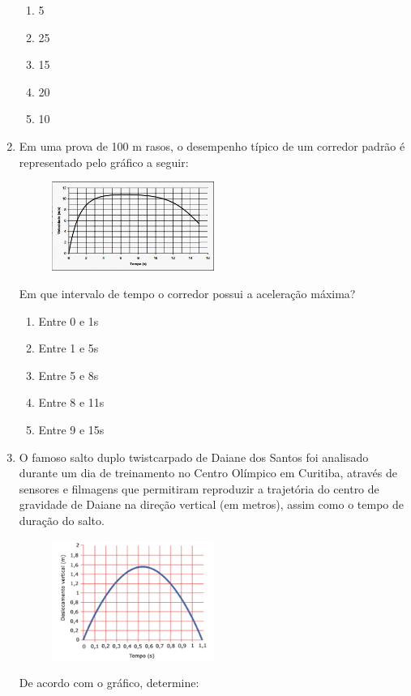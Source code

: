 \documentclass[12pt,letterpaper,fleqn]{article}
\begin{document}
\begin{enumerate}
    \begin{enumerate}
        \item 5
        \item 25
        \item 15
        \item 20
        \item 10
    \end{enumerate}
    
    \item Em uma prova de 100 m rasos, o desempenho típico de um corredor padrão é representado pelo gráfico a seguir:
    
    \begin{figure}[H]
        \centering
        \includegraphics[width=0.5\textwidth]{BDQO.jpg}
        \label{fig:ex_3}
    \end{figure}
    Em que intervalo de tempo o corredor possui a aceleração máxima?
    
    \begin{enumerate}
        \item Entre 0 e 1s
        \item Entre 1 e 5s
        \item Entre 5 e 8s
        \item Entre 8 e 11s
        \item Entre 9 e 15s
    \end{enumerate}
    
    \item O famoso salto duplo twistcarpado de Daiane dos Santos foi analisado durante um dia de treinamento no Centro Olímpico em Curitiba, através de sensores e filmagens que permitiram reproduzir a trajetória do centro de gravidade de Daiane na direção vertical (em metros), assim como o tempo de duração do salto.
    
    \begin{figure}[H]
        \centering
        \includegraphics[width=0.5\textwidth]{download.png}
        \label{fig:ex_4}
    \end{figure}
    De acordo com o gráfico, determine:
    

\end{enumerate}
\end{document}
